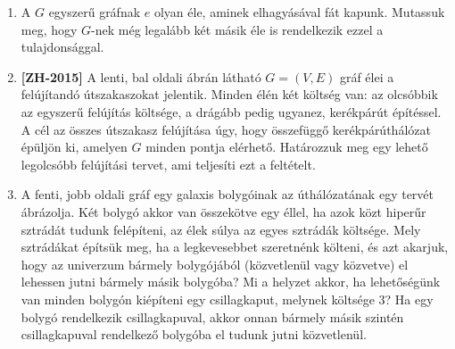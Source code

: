 \documentclass[a4paper,12pt]{article}
\begin{document}
\begin{enumerate}
        
        \item A $G$ egyszerű gráfnak $e$ olyan éle, aminek elhagyásával fát kapunk. Mutassuk meg, hogy $G$-nek még legalább két másik éle is rendelkezik ezzel a tulajdonsággal.
    
        
        

        
        \item \textbf{[ZH-2015]} A lenti, bal oldali ábrán látható $G = (V, E)$ gráf élei a felújítandó útszakaszokat jelentik. Minden élén két költség van: az olcsóbbik az egyszerű felújítás költsége, a drágább pedig ugyanez, kerékpárút építéssel. A cél az összes útszakasz felújítása úgy, hogy összefüggő kerékpárúthálózat épüljön ki, amelyen $G$ minden pontja elérhető. Határozzuk meg egy lehető legolcsóbb felújítási tervet, ami teljesíti ezt a feltételt.
        
        \begin{figure}[h]
            \centering
            \begin{subfigure}{0.45\textwidth}
                \centering
                 \hspace{1in}
            \end{subfigure}
            \begin{subfigure}{0.45\textwidth}
                \centering
                
            \end{subfigure}
        \end{figure}
        
        \item A fenti, jobb oldali gráf egy galaxis bolygóinak az úthálózatának egy tervét ábrázolja. Két bolygó akkor van összekötve egy éllel, ha azok közt hiperűr sztrádát tudunk felépíteni, az élek súlya az egyes sztrádák költsége. Mely sztrádákat építsük meg, ha a legkevesebbet szeretnénk költeni, és azt akarjuk, hogy az univerzum bármely bolygójából (közvetlenül vagy közvetve) el lehessen jutni bármely másik bolygóba? Mi a helyzet akkor, ha lehetőségünk van minden bolygón kiépíteni egy csillagkaput, melynek költsége $3$? Ha egy bolygó rendelkezik csillagkapuval, akkor onnan bármely másik szintén csillagkapuval rendelkező bolygóba el tudunk jutni közvetlenül.


\end{enumerate}
\end{document}
